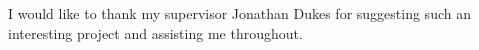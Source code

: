 \begin{thesisacknowledgments}
I would like to thank my supervisor Jonathan Dukes for suggesting such an interesting
project and assisting me throughout.

\end{thesisacknowledgments}
